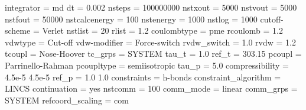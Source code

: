 \documentclass[
  letterpaper,
  DIV=11,
  numbers=noendperiod]{scrartcl}
\newenvironment{Shaded}{\begin{snugshade}}{\end{snugshade}}
\newcommand{\ExtensionTok}[1]{\textcolor[rgb]{0.00,0.23,0.31}{#1}}
\newcommand{\NormalTok}[1]{\textcolor[rgb]{0.00,0.23,0.31}{#1}}
\begin{document}
\begin{Shaded}
\begin{Highlighting}[]
\ExtensionTok{integrator}\NormalTok{              = md}
\ExtensionTok{dt}\NormalTok{                      = 0.002}
\ExtensionTok{nsteps}\NormalTok{                  = 100000000}
\ExtensionTok{nstxout}\NormalTok{                 = 5000}
\ExtensionTok{nstvout}\NormalTok{                 = 5000}
\ExtensionTok{nstfout}\NormalTok{                 = 50000}
\ExtensionTok{nstcalcenergy}\NormalTok{           = 100}
\ExtensionTok{nstenergy}\NormalTok{               = 1000}
\ExtensionTok{nstlog}\NormalTok{                  = 1000}
\ExtensionTok{cutoff{-}scheme}\NormalTok{           = Verlet}
\ExtensionTok{nstlist}\NormalTok{                 = 20}
\ExtensionTok{rlist}\NormalTok{                   = 1.2}
\ExtensionTok{coulombtype}\NormalTok{             = pme}
\ExtensionTok{rcoulomb}\NormalTok{                = 1.2}
\ExtensionTok{vdwtype}\NormalTok{                 = Cut{-}off}
\ExtensionTok{vdw{-}modifier}\NormalTok{            = Force{-}switch}
\ExtensionTok{rvdw\_switch}\NormalTok{             = 1.0}
\ExtensionTok{rvdw}\NormalTok{                    = 1.2}
\ExtensionTok{tcoupl}\NormalTok{                  = Nose{-}Hoover}
\ExtensionTok{tc\_grps}\NormalTok{                 = SYSTEM}
\ExtensionTok{tau\_t}\NormalTok{                   = 1.0}
\ExtensionTok{ref\_t}\NormalTok{                   = 303.15}
\ExtensionTok{pcoupl}\NormalTok{                  = Parrinello{-}Rahman}
\ExtensionTok{pcoupltype}\NormalTok{              = semiisotropic}
\ExtensionTok{tau\_p}\NormalTok{                   = 5.0}
\ExtensionTok{compressibility}\NormalTok{         = 4.5e{-}5  4.5e{-}5}
\ExtensionTok{ref\_p}\NormalTok{                   = 1.0     1.0}
\ExtensionTok{constraints}\NormalTok{             = h{-}bonds}
\ExtensionTok{constraint\_algorithm}\NormalTok{    = LINCS}
\ExtensionTok{continuation}\NormalTok{            = yes}
\ExtensionTok{nstcomm}\NormalTok{                 = 100}
\ExtensionTok{comm\_mode}\NormalTok{               = linear}
\ExtensionTok{comm\_grps}\NormalTok{               = SYSTEM}
\ExtensionTok{refcoord\_scaling}\NormalTok{        = com}
\end{Highlighting}
\end{Shaded}
\end{document}
